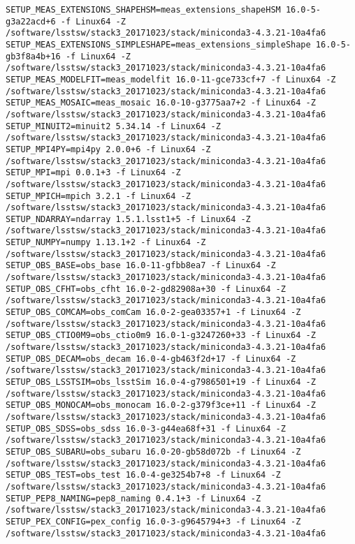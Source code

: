 \begin{verbatim}
SETUP_MEAS_EXTENSIONS_SHAPEHSM=meas_extensions_shapeHSM 16.0-5-g3a22acd+6 -f Linux64 -Z /software/lsstsw/stack3_20171023/stack/miniconda3-4.3.21-10a4fa6
SETUP_MEAS_EXTENSIONS_SIMPLESHAPE=meas_extensions_simpleShape 16.0-5-gb3f8a4b+16 -f Linux64 -Z /software/lsstsw/stack3_20171023/stack/miniconda3-4.3.21-10a4fa6
SETUP_MEAS_MODELFIT=meas_modelfit 16.0-11-gce733cf+7 -f Linux64 -Z /software/lsstsw/stack3_20171023/stack/miniconda3-4.3.21-10a4fa6
SETUP_MEAS_MOSAIC=meas_mosaic 16.0-10-g3775aa7+2 -f Linux64 -Z /software/lsstsw/stack3_20171023/stack/miniconda3-4.3.21-10a4fa6
SETUP_MINUIT2=minuit2 5.34.14 -f Linux64 -Z /software/lsstsw/stack3_20171023/stack/miniconda3-4.3.21-10a4fa6
SETUP_MPI4PY=mpi4py 2.0.0+6 -f Linux64 -Z /software/lsstsw/stack3_20171023/stack/miniconda3-4.3.21-10a4fa6
SETUP_MPI=mpi 0.0.1+3 -f Linux64 -Z /software/lsstsw/stack3_20171023/stack/miniconda3-4.3.21-10a4fa6
SETUP_MPICH=mpich 3.2.1 -f Linux64 -Z /software/lsstsw/stack3_20171023/stack/miniconda3-4.3.21-10a4fa6
SETUP_NDARRAY=ndarray 1.5.1.lsst1+5 -f Linux64 -Z /software/lsstsw/stack3_20171023/stack/miniconda3-4.3.21-10a4fa6
SETUP_NUMPY=numpy 1.13.1+2 -f Linux64 -Z /software/lsstsw/stack3_20171023/stack/miniconda3-4.3.21-10a4fa6
SETUP_OBS_BASE=obs_base 16.0-11-gfbb8ea7 -f Linux64 -Z /software/lsstsw/stack3_20171023/stack/miniconda3-4.3.21-10a4fa6
SETUP_OBS_CFHT=obs_cfht 16.0-2-gd82908a+30 -f Linux64 -Z /software/lsstsw/stack3_20171023/stack/miniconda3-4.3.21-10a4fa6
SETUP_OBS_COMCAM=obs_comCam 16.0-2-gea03357+1 -f Linux64 -Z /software/lsstsw/stack3_20171023/stack/miniconda3-4.3.21-10a4fa6
SETUP_OBS_CTIO0M9=obs_ctio0m9 16.0-1-g3247260+33 -f Linux64 -Z /software/lsstsw/stack3_20171023/stack/miniconda3-4.3.21-10a4fa6
SETUP_OBS_DECAM=obs_decam 16.0-4-gb463f2d+17 -f Linux64 -Z /software/lsstsw/stack3_20171023/stack/miniconda3-4.3.21-10a4fa6
SETUP_OBS_LSSTSIM=obs_lsstSim 16.0-4-g7986501+19 -f Linux64 -Z /software/lsstsw/stack3_20171023/stack/miniconda3-4.3.21-10a4fa6
SETUP_OBS_MONOCAM=obs_monocam 16.0-2-g379f3ce+11 -f Linux64 -Z /software/lsstsw/stack3_20171023/stack/miniconda3-4.3.21-10a4fa6
SETUP_OBS_SDSS=obs_sdss 16.0-3-g44ea68f+31 -f Linux64 -Z /software/lsstsw/stack3_20171023/stack/miniconda3-4.3.21-10a4fa6
SETUP_OBS_SUBARU=obs_subaru 16.0-20-gb58d072b -f Linux64 -Z /software/lsstsw/stack3_20171023/stack/miniconda3-4.3.21-10a4fa6
SETUP_OBS_TEST=obs_test 16.0-4-ge3254b7+8 -f Linux64 -Z /software/lsstsw/stack3_20171023/stack/miniconda3-4.3.21-10a4fa6
SETUP_PEP8_NAMING=pep8_naming 0.4.1+3 -f Linux64 -Z /software/lsstsw/stack3_20171023/stack/miniconda3-4.3.21-10a4fa6
SETUP_PEX_CONFIG=pex_config 16.0-3-g9645794+3 -f Linux64 -Z /software/lsstsw/stack3_20171023/stack/miniconda3-4.3.21-10a4fa6

\end{verbatim}

